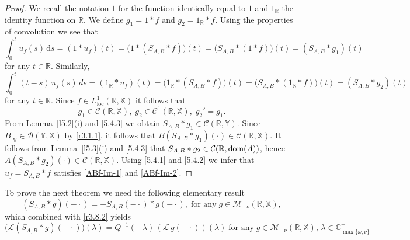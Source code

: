\documentclass[11pt]{amsart}
\numberwithin{equation}{section}
\newcommand{\RR}{{\mathbb R}}
\newcommand{\rmd}{{\mathrm{d}}}
\theoremstyle{remark}
\theoremstyle{definition}
\newcommand\bX{{\mathbb X}}
\newcommand\bY{{\mathbb Y}}
\newcommand{\dom}{\text{\rm{dom}}}
\begin{document}
\begin{proof}
	We recall the notation $1$ for the function identically equal to $1$ and $1_\RR$ the identity function on $\RR$. We define $g_1=1*f$ and $g_2=1_\RR*f$.
	Using the properties of convolution we see that
	\begin{equation}\label{5.4.1} 
		\int_0^t u_f(s)\,\rmd s = (1 * u_f)(t) = \bigl(1 * (S_{A,B} * f)\bigr)(t)
		= \bigl(S_{A,B} * (1 * f)\bigr)(t) = (S_{A,B} * g_1)(t)
	\end{equation}
	for any $t \in \mathbb{R}$.
	Similarly,
	\begin{equation}\label{5.4.2}
		\int_0^t (t-s)\,u_f(s)\,ds = (1_{\mathbb{R}} * u_f)(t) = \bigl(1_{\mathbb{R}} * (S_{A,B} * f)\bigr)(t)
		= \bigl(S_{A,B} * (1_{\mathbb{R}} * f)\bigr)(t) = (S_{A,B} * g_2)(t) 
	\end{equation}
	for any $t \in \mathbb{R}$. Since $f \in L^1_{\mathrm{loc}}(\mathbb{R}, \bX)$ it follows that
	\begin{equation}\label{5.4.3}
		g_1 \in \mathcal{C}(\mathbb{R}, \bX), \; g_2 \in \mathcal{C}^1(\mathbb{R}, \bX), \;g_2' = g_1.
	\end{equation}
	From Lemma~\ref{l5.2}(i) and \eqref{5.4.3} we obtain
	$S_{A,B} * g_1 \in \mathcal{C}(\mathbb{R}, \bY)$. Since $B|_\bY \in \mathcal{B}(\bY, \bX)$ by \eqref{r3.1.1}, it follows that $B(S_{A,B} * g_1)(\cdot) \in \mathcal{C}(\mathbb{R}, \bX)$. It follows from Lemma~\ref{l5.3}(i) and \eqref{5.4.3} that $S_{A,B} * g_2 \in \mathcal{C}(\mathbb{R}, \dom(A))$, hence $A(S_{A,B} * g_2)(\cdot) \in \mathcal{C}(\mathbb{R}, \bX)$. Using \eqref{5.4.1} and \eqref{5.4.2} we infer that $u_f =S_{A,B}*f$ satisfies \eqref{ABf-Im-1} and \eqref{ABf-Im-2}.
\end{proof}
To prove the next theorem we need the following elementary result
\begin{equation}\label{5.4.4} 
	(S_{A,B} * g)(-\cdot) = -S_{A,B}(-\cdot) * g(-\cdot), \;\mbox{for any}\; g \in \mathcal{M}_{-\nu}(\mathbb{R}, \bX),
\end{equation}
which combined with \eqref{r3.8.2} yields
\begin{equation}\label{5.4.5} 
	\bigl(\mathcal{L}(S_{A,B} * g)(-\cdot)\bigr)(\lambda) = Q^{-1}(-\lambda)\,(\mathcal{L}\,g(-\cdot))(\lambda)\;\mbox{for any}\; g \in \mathcal{M}_{-\nu}(\mathbb{R}, \bX),\,\lambda \in \mathbb{C}^+_{\max\{\omega,\nu\}}
\end{equation}
\end{document}
